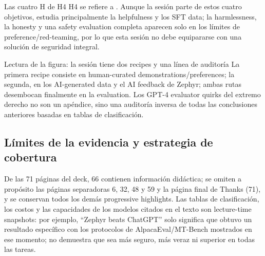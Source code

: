
\begin{importantbox}{Las cuatro H de H4}
H4 se refiere a . Aunque la sesión parte de estos cuatro objetivos, estudia principalmente la helpfulness y los SFT data; la harmlessness, la honesty y una safety evaluation completa aparecen solo en los límites de preference/red-teaming, por lo que esta sesión no debe equipararse con una solución de seguridad integral.
\end{importantbox}



\begin{knowledgebox}{Lectura de la figura: la sesión tiene dos recipes y una línea de auditoría}
La primera recipe consiste en human-curated demonstrations/preferences; la segunda, en los AI-generated data y el AI feedback de Zephyr; ambas rutas desembocan finalmente en la evaluation. Los GPT-4 evaluator quirks del extremo derecho no son un apéndice, sino una auditoría inversa de todas las conclusiones anteriores basadas en tablas de clasificación.
\end{knowledgebox}

\subsection{Límites de la evidencia y estrategia de cobertura}

De las 71 páginas del deck, 66 contienen información didáctica; se omiten a propósito las páginas separadoras 6, 32, 48 y 59 y la página final de Thanks (71), y se conservan todos los demás progressive highlights. Las tablas de clasificación, los costos y las capacidades de los modelos citados en el texto son lecture-time snapshots: por ejemplo, ``Zephyr beats ChatGPT'' solo significa que obtuvo un resultado específico con los protocolos de AlpacaEval/MT-Bench mostrados en ese momento; no demuestra que sea más seguro, más veraz ni superior en todas las tareas.

